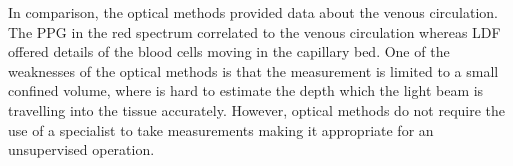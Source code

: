 In comparison, the optical methods provided data about the venous circulation. The PPG in the red spectrum correlated to the venous circulation whereas LDF offered details of the blood cells moving in the capillary bed. One of the weaknesses of the optical methods is that the measurement is limited to a small confined volume, where is hard to estimate the depth which the light beam is travelling into the tissue accurately. However, optical methods do not require the use of a specialist to take measurements making it appropriate for an unsupervised operation.



